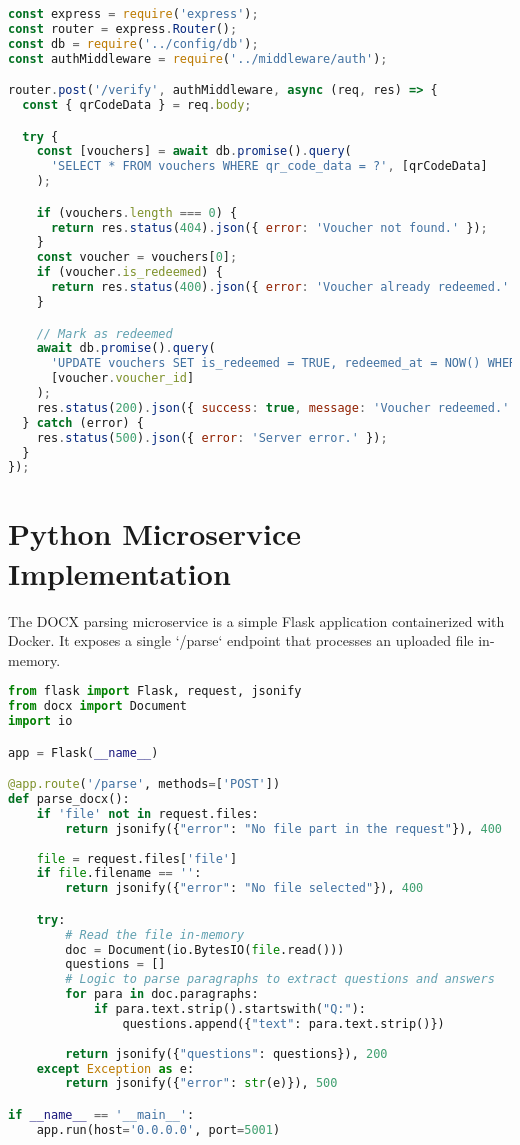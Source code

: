 \FloatBarrier
\begin{lstlisting}[language=JavaScript, caption={Express.js route for secure voucher verification.}]
const express = require('express');
const router = express.Router();
const db = require('../config/db');
const authMiddleware = require('../middleware/auth');

router.post('/verify', authMiddleware, async (req, res) => {
  const { qrCodeData } = req.body;

  try {
    const [vouchers] = await db.promise().query(
      'SELECT * FROM vouchers WHERE qr_code_data = ?', [qrCodeData]
    );

    if (vouchers.length === 0) {
      return res.status(404).json({ error: 'Voucher not found.' });
    }
    const voucher = vouchers[0];
    if (voucher.is_redeemed) {
      return res.status(400).json({ error: 'Voucher already redeemed.' });
    }

    // Mark as redeemed
    await db.promise().query(
      'UPDATE vouchers SET is_redeemed = TRUE, redeemed_at = NOW() WHERE voucher_id = ?',
      [voucher.voucher_id]
    );
    res.status(200).json({ success: true, message: 'Voucher redeemed.' });
  } catch (error) {
    res.status(500).json({ error: 'Server error.' });
  }
});
\end{lstlisting}
\FloatBarrier

\section{Python Microservice Implementation}
\label{sec:impl-python}
The DOCX parsing microservice is a simple Flask application containerized with Docker. It exposes a single `/parse` endpoint that processes an uploaded file in-memory.

\FloatBarrier
\begin{lstlisting}[language=Python, caption={Core logic of the Flask-based DOCX parsing microservice.}]
from flask import Flask, request, jsonify
from docx import Document
import io

app = Flask(__name__)

@app.route('/parse', methods=['POST'])
def parse_docx():
    if 'file' not in request.files:
        return jsonify({"error": "No file part in the request"}), 400
    
    file = request.files['file']
    if file.filename == '':
        return jsonify({"error": "No file selected"}), 400

    try:
        # Read the file in-memory
        doc = Document(io.BytesIO(file.read()))
        questions = []
        # Logic to parse paragraphs to extract questions and answers
        for para in doc.paragraphs:
            if para.text.strip().startswith("Q:"):
                questions.append({"text": para.text.strip()})
        
        return jsonify({"questions": questions}), 200
    except Exception as e:
        return jsonify({"error": str(e)}), 500

if __name__ == '__main__':
    app.run(host='0.0.0.0', port=5001)
\end{lstlisting}
\FloatBarrier

